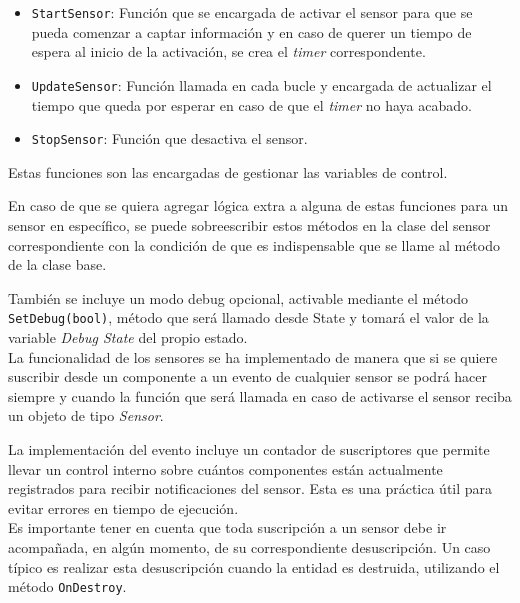 \begin{itemize}
	\item \texttt{StartSensor}: Función que se encargada de activar el sensor para que se pueda comenzar a captar información y en caso de querer un tiempo de espera al inicio de la activación, se crea el \textit{timer} correspondente.
	\item \texttt{UpdateSensor}: Función llamada en cada bucle y encargada de actualizar el tiempo que queda por esperar en caso de que el \textit{timer} no haya acabado.
	\item \texttt{StopSensor}: Función que desactiva el sensor.
\end{itemize}
Estas funciones son las encargadas de gestionar las variables de control.

En caso de que se quiera agregar lógica extra a alguna de estas funciones para un sensor en específico, se puede sobreescribir estos métodos en la clase del sensor correspondiente con la condición de que es indispensable que se llame al método de la clase base.

También se incluye un modo debug opcional, activable mediante el método \texttt{SetDebug(bool)}, método que será llamado desde State y tomará el valor de la variable \textit{Debug State} del propio estado.\\

La funcionalidad de los sensores se ha implementado de manera que si se quiere suscribir desde un componente a un evento de cualquier sensor se podrá hacer siempre y cuando la función que será llamada en caso de activarse el sensor reciba un objeto de tipo \textit{Sensor}.\\


La implementación del evento incluye un contador de suscriptores que permite llevar un control interno sobre cuántos componentes están actualmente registrados para recibir notificaciones del sensor. Esta es una práctica útil para evitar errores en tiempo de ejecución.\\

Es importante tener en cuenta que toda suscripción a un sensor debe ir acompañada, en algún momento, de su correspondiente desuscripción. Un caso típico es realizar esta desuscripción cuando la entidad es destruida, utilizando el método \texttt{OnDestroy}.\\

